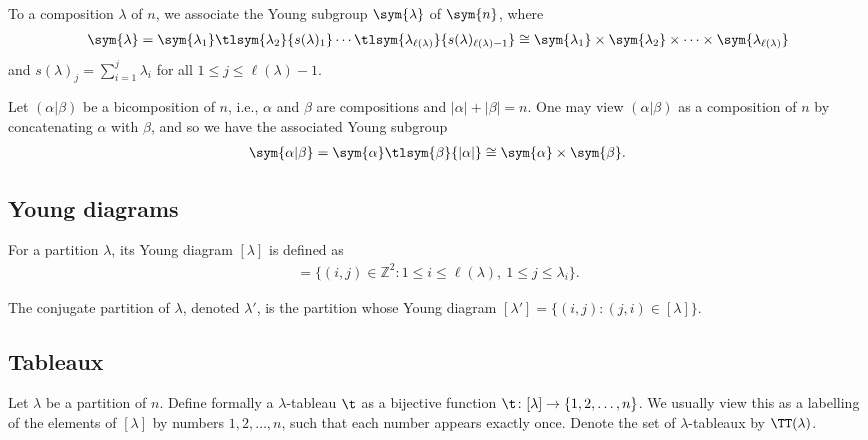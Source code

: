 To a composition $\lambda$ of $n$, we associate the Young subgroup $\sym{\lambda}$ of $\sym{n}$, where{\samepage
\begin{gather*}
\sym{\lambda} = \sym{\lambda_1} \tlsym{\lambda_2}{s(\lambda)_1} \dotsm \tlsym{\lambda_{\ell(\lambda)}}{s(\lambda)_{\ell(\lambda)-1}} \cong \sym{\lambda_1} \times \sym{\lambda_2} \times \dotsb \times \sym{\lambda_{\ell(\lambda)}}
\end{gather*}
and $s(\lambda)_j = \sum\limits_{i=1}^j \lambda_i$ for all $1 \leq j \leq \ell(\lambda)-1$.}

Let $(\alpha|\beta)$ be a bicomposition of $n$, i.e., $\alpha$ and $\beta$ are compositions and $|\alpha| + |\beta| = n$. One may view $(\alpha|\beta)$ as a composition of $n$ by concatenating $\alpha$ with $\beta$, and so we have the associated Young subgroup
\begin{gather*}
\sym{\alpha|\beta} = \sym{\alpha} \tlsym{\beta}{|\alpha|} \cong \sym{\alpha} \times \sym{\beta}.\end{gather*}

\subsection{Young diagrams}

For a partition $\lambda$, its Young diagram $[\lambda]$ is defined as
\begin{gather*}
[\lambda] = \big\{ (i,j) \in \mathbb{Z}^2 \colon 1\leq i \leq \ell(\lambda),\ 1 \leq j \leq \lambda_i \big\}.
\end{gather*}

The conjugate partition of $\lambda$, denoted $\lambda'$, is the partition whose Young diagram $[\lambda'] = \{ (i,j)\colon (j,i) \in [\lambda] \}$.

\subsection{Tableaux} \label{SS:Tableaux}

Let $\lambda$ be a partition of $n$. Define formally a $\lambda$-tableau $\t$ as a bijective function $\t\colon [\lambda] \to \{1,2,\dotsc,n \}$. We usually view this as a labelling of the elements of $[\lambda]$ by numbers $1,2,\dotsc,n$, such that each number appears exactly once. Denote the set of $\lambda$-tableaux by $\TT(\lambda)$.

